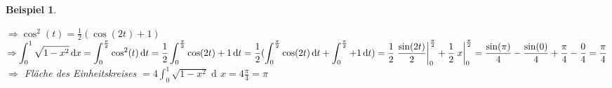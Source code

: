 \documentclass[a4paper,titlepage,oneside]{article}
\newcommand{\der}{\operatorname{d\!}{}}
\newcommand{\integral}[4][x]{\ensuremath{\int_{#2}^{#3}{#4\der #1}}}
\newcommand{\stamm}[3]{\ensuremath{\left.\vphantom{\frac{1}{n}}#3\right|_{#1}^{#2}}}
\theoremstyle{thmstyle}
\newtheorem{bsp}[satz]{Beispiel}
\theoremstyle{subthmstyle}
\begin{document}
\begin{bsp}
\begin{enumerate}
$\displaystyle\Rightarrow \cos^2(t) = \frac{1}{2} (\cos(2t) +1)$\\
$\displaystyle\Rightarrow \integral{0}{1}{\sqrt{1-x^2}} = \integral[t]{0}{\frac{\pi}{2}}{\cos^2(t)} =  \frac{1}{2} \integral[t]{0}{\frac{\pi}{2}}{\cos(2t) +1} =  \frac{1}{2} (\integral[t]{0}{\frac{\pi}{2}}{\cos(2t)} + \integral[t]{0}{\frac{\pi}{2}}{ +1} ) = \frac{1}{2} \stamm{0}{\frac{\pi}{2}}{\frac{\sin(2t)}{2}} + \frac{1}{2} \stamm{0}{\frac{\pi}{2}}{x} = \frac{\sin(\pi)}{4} - \frac{\sin(0)}{4} + \frac{\pi}{4} - \frac{0}{4} = \frac{\pi}{4}$\\
$\Rightarrow$ Fläche des Einheitskreises $\displaystyle= 4 \integral{0}{1}{\sqrt{1 - x^2}} = 4 \frac{\pi}{4} = \pi$
\end{enumerate}
\end{bsp}
\end{document}
